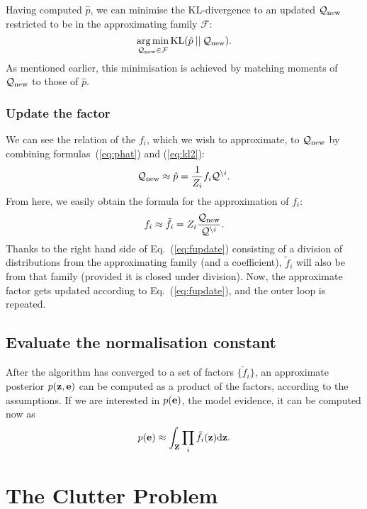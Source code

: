\documentclass[11pt]{article}
\begin{document}
Having computed $\hat{p}$, we can minimise the KL-divergence to an updated 
$\mathcal{Q}_{\text{new}}$ restricted to be in the approximating family 
$\mathcal{F}$:
\begin{equation}
	\argmin_{\kve_{\text{new}}\in\mathcal{F}}%
		\KL{\hat{p}}{\kve_{\text{new}}}.
	\label{eq:kl2}
\end{equation}
As mentioned earlier, this minimisation is achieved by matching moments of 
$\mathcal{Q}_{\text{new}}$ to those of $\hat{p}$.

\subsubsection{Update the factor}
We can see the relation of the $f_i$, which we wish to approximate, to 
$\mathcal{Q}_{\text{new}}$ by combining formulas~(\ref{eq:phat}) and 
(\ref{eq:kl2}):
\begin{equation}
	\mathcal{Q}_{\text{new}} \approx \hat{p} = \frac{1}{Z_i}f_i\mathcal{Q}^{\setminus i}.
\end{equation}
From here, we easily obtain the formula for the approximation of $f_i$:
\begin{equation}
	f_i \approx \tilde{f}_i = Z_i\frac{\mathcal{Q}_{\text{new}}}{\mathcal{Q}^{\setminus 
	i}}.
	\label{eq:fupdate}
\end{equation}
Thanks to the right hand side of Eq.~(\ref{eq:fupdate}) consisting of 
a division of distributions from the approximating family (and 
a coefficient), $\tilde{f}_i$ will also be from that family (provided it is 
closed under division).  Now, the approximate factor gets updated according 
to Eq.~(\ref{eq:fupdate}), and the outer loop is repeated.

\subsection{Evaluate the normalisation constant}
After the algorithm has converged to a set of factors $\{\tilde{f}_i\}$, an 
approximate posterior $p(\mathbf{z}, \mathbf{e})$ can be computed as a product of 
the factors, according to the assumptions. If we are interested in 
$p(\mathbf{e})$, the model evidence, it can be computed now as
\begin{equation}
	p(\mathbf{e}) \approx \int_{\mathbf{Z}} \prod_i\tilde{f}_i(\mathbf{z}) \mathrm{d}\mathbf{z}.
	\label{eq:normaliser}
\end{equation}

\renewcommand{\thesubsection}{\oldss}
\renewcommand{\thesubsubsection}{\oldsss}

\section{The Clutter Problem}
\label{sec:clutter}
\end{document}
